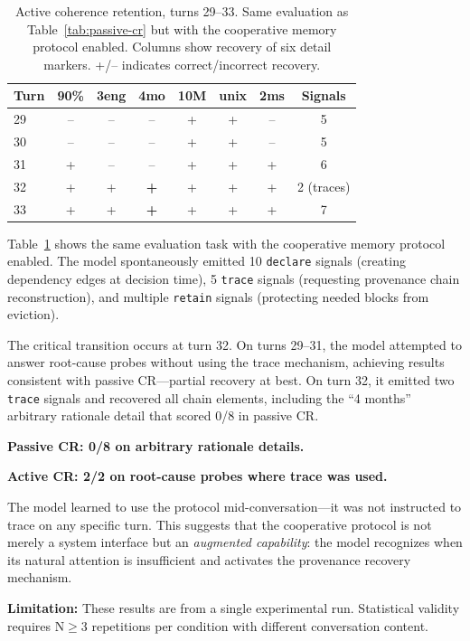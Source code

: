\documentclass[sigplan,screen,anonymous]{acmart}
\begin{document}
\begin{table}[t]
\centering
\caption{Active coherence retention, turns 29--33. Same evaluation as
  Table~\ref{tab:passive-cr} but with the cooperative memory protocol
  enabled. Columns show recovery of six detail markers.
  +/-- indicates correct/incorrect recovery.}
\label{tab:active-cr}
\begin{tabular}{lccccccc}
\toprule
Turn & 90\% & 3eng & 4mo & 10M & unix & 2ms & Signals \\
\midrule
29 & -- & -- & -- & + & + & -- & 5 \\
30 & -- & -- & -- & + & + & -- & 5 \\
31 & +  & -- & -- & + & + & +  & 6 \\
32 & +  & +  & \textbf{+} & + & + & + & 2 (traces) \\
33 & +  & +  & \textbf{+} & + & + & + & 7 \\
\bottomrule
\end{tabular}
\end{table}

Table~\ref{tab:active-cr} shows the same evaluation task with the
cooperative memory protocol enabled. The model spontaneously emitted
10 \texttt{declare} signals (creating dependency edges at decision
time), 5 \texttt{trace} signals (requesting provenance chain
reconstruction), and multiple \texttt{retain} signals (protecting
needed blocks from eviction).

The critical transition occurs at turn 32. On turns 29--31, the model
attempted to answer root-cause probes without using the trace
mechanism, achieving results consistent with passive CR---partial
recovery at best. On turn 32, it emitted two \texttt{trace} signals
and recovered all chain elements, including the ``4 months'' arbitrary
rationale detail that scored 0/8 in passive CR.

\textbf{Passive CR: 0/8 on arbitrary rationale details.}

\textbf{Active CR: 2/2 on root-cause probes where trace was used.}

The model learned to use the protocol mid-conversation---it was not
instructed to trace on any specific turn. This suggests that the
cooperative protocol is not merely a system interface but an
\emph{augmented capability}: the model recognizes when its natural
attention is insufficient and activates the provenance recovery
mechanism.

\textbf{Limitation:} These results are from a single experimental
run. Statistical validity requires N$\geq$3 repetitions per condition
with different conversation content.
\end{document}
